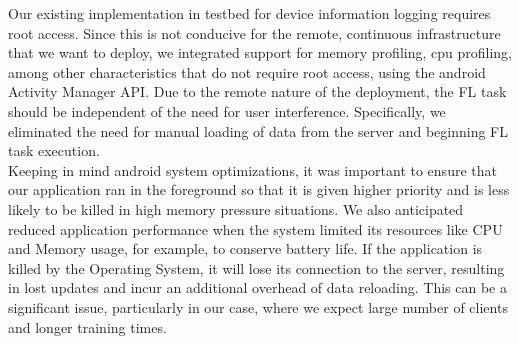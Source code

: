     Our existing implementation in testbed for device information logging requires root access. Since this is not conducive for the remote, continuous infrastructure that we want to deploy, we integrated support for memory profiling, cpu profiling, among other characteristics that do not require root access, using the android Activity Manager API.
    Due to the remote nature of the deployment, the FL task should be independent of the need for user interference. Specifically, we eliminated the need for manual loading of data from the server and beginning FL task execution. \\

    Keeping in mind android system optimizations, it was important to ensure that our application ran in the foreground so that it is given higher priority and is less likely to be killed in high memory pressure situations. We also anticipated reduced application performance when the system limited its resources like CPU and Memory usage, for example, to conserve battery life. If the application is killed by the Operating System, it will lose its connection to the server, resulting in lost updates and incur an additional overhead of data reloading. This can be a significant issue, particularly in our case, where we expect large number of clients and longer training times. \\

